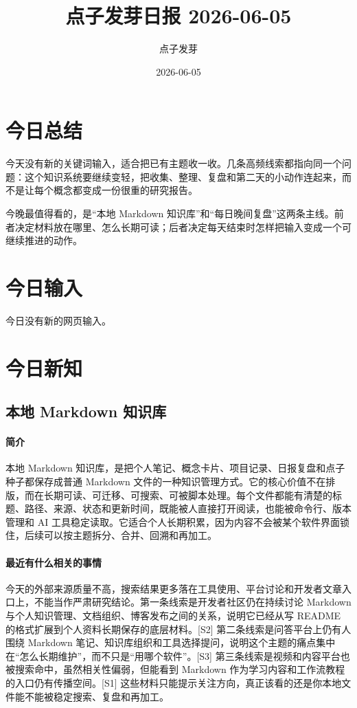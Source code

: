\documentclass[UTF8,zihao=-4]{ctexart}
\title{\bfseries 点子发芽日报 2026-06-05}
\author{点子发芽}
\date{2026-06-05}
\begin{document}
\maketitle
\section*{今日总结}
今天没有新的关键词输入，适合把已有主题收一收。几条高频线索都指向同一个问题：这个知识系统要继续变轻，把收集、整理、复盘和第二天的小动作连起来，而不是让每个概念都变成一份很重的研究报告。

今晚最值得看的，是“本地 Markdown 知识库”和“每日晚间复盘”这两条主线。前者决定材料放在哪里、怎么长期可读；后者决定每天结束时怎样把输入变成一个可继续推进的动作。
\section*{今日输入}
今日没有新的网页输入。
\section*{今日新知}
\subsection*{本地 Markdown 知识库}
\paragraph{简介} 本地 Markdown 知识库，是把个人笔记、概念卡片、项目记录、日报复盘和点子种子都保存成普通 Markdown 文件的一种知识管理方式。它的核心价值不在排版，而在长期可读、可迁移、可搜索、可被脚本处理。每个文件都能有清楚的标题、路径、来源、状态和更新时间，既能被人直接打开阅读，也能被命令行、版本管理和 AI 工具稳定读取。它适合个人长期积累，因为内容不会被某个软件界面锁住，后续可以按主题拆分、合并、回溯和再加工。
\paragraph{最近有什么相关的事情} 今天的外部来源质量不高，搜索结果更多落在工具使用、平台讨论和开发者文章入口上，不能当作严肃研究结论。第一条线索是开发者社区仍在持续讨论 Markdown 与个人知识管理、文档组织、博客发布之间的关系，说明它已经从写 README 的格式扩展到个人资料长期保存的底层材料。[S2] 第二条线索是问答平台上仍有人围绕 Markdown 笔记、知识库组织和工具选择提问，说明这个主题的痛点集中在“怎么长期维护”，而不只是“用哪个软件”。[S3] 第三条线索是视频和内容平台也被搜索命中，虽然相关性偏弱，但能看到 Markdown 作为学习内容和工作流教程的入口仍有传播空间。[S1] 这些材料只能提示关注方向，真正该看的还是你本地文件能不能被稳定搜索、复盘和再加工。
\end{document}

